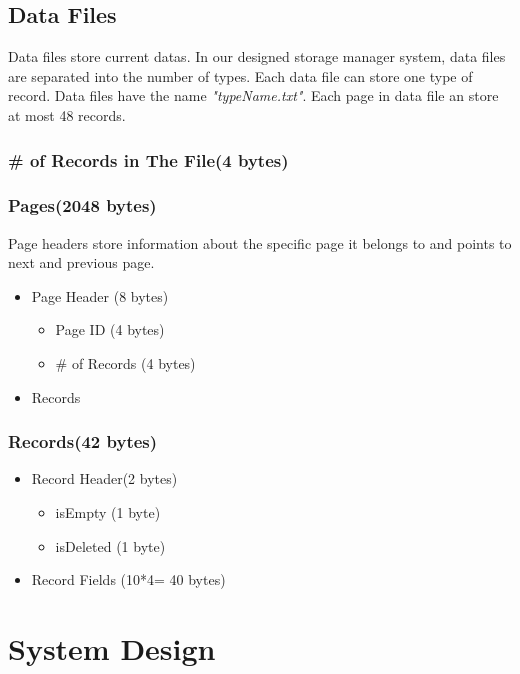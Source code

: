 \documentclass{article}
\newcounter{points}
\begin{document}
    \subsection{Data Files}
        Data files store current datas. In our designed storage manager system, data files are separated into the number of types. Each data file can store one type of record. Data files have the name \emph{"typeName.txt"}. Each page in data file an store at most 48 records.
        \subsubsection{\# of Records in The File(4 bytes)}
        \subsubsection{Pages(2048 bytes)}
            Page headers store information about the specific page it belongs to and points to next and previous page.
            \begin{itemize}
              \item Page Header (8 bytes)
                \begin{itemize}
                     \item Page ID (4 bytes)
                     \item \# of Records (4 bytes)
                \end{itemize}
              \item Records 
            \end{itemize}
        \subsubsection{Records(42 bytes)}
            \begin{itemize}
              \item Record Header(2 bytes)
                \begin{itemize}
                    \item isEmpty (1 byte)
                    \item isDeleted (1 byte)
                \end{itemize}
              \item Record Fields (10*4= 40 bytes)
            \end{itemize}


\section{System Design}
\end{document}
